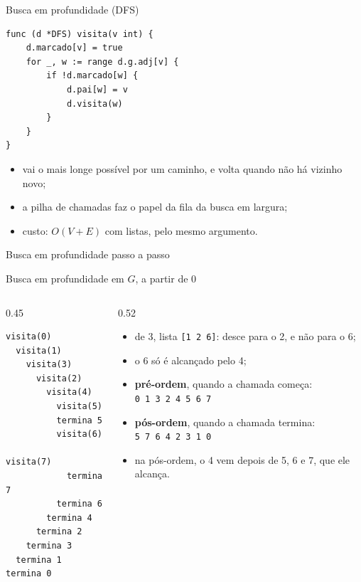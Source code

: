 \documentclass{beamer}
\begin{document}
\begin{frame}[fragile]{Busca em profundidade (DFS)}
	\begin{verbatim}
func (d *DFS) visita(v int) {
	d.marcado[v] = true
	for _, w := range d.g.adj[v] {
		if !d.marcado[w] {
			d.pai[w] = v
			d.visita(w)
		}
	}
}
\end{verbatim}

	\begin{itemize}
		\item vai o mais longe possível por um caminho, e volta quando não há
		      vizinho novo;
		\item a pilha de chamadas faz o papel da fila da busca em largura;
		\item custo: $O(V + E)$ com listas, pelo mesmo argumento.
	\end{itemize}
\end{frame}

\begin{frame}{Busca em profundidade passo a passo}
	\begin{center}
	\end{center}
\end{frame}

\begin{frame}[fragile]{Busca em profundidade em $G$, a partir de 0}
	\begin{columns}[T]
		\begin{column}{0.45\textwidth}
			\begin{verbatim}
visita(0)
  visita(1)
    visita(3)
      visita(2)
        visita(4)
          visita(5)
          termina 5
          visita(6)
            visita(7)
            termina 7
          termina 6
        termina 4
      termina 2
    termina 3
  termina 1
termina 0
\end{verbatim}
		\end{column}
		\begin{column}{0.52\textwidth}
			\begin{itemize}
				\small
				\item de 3, lista \texttt{[1 2 6]}: desce para o 2, e não para o 6;
				\item o 6 só é alcançado pelo 4;
				\item \textbf{pré-ordem}, quando a chamada começa:\\
				      \texttt{0 1 3 2 4 5 6 7}
				\item \textbf{pós-ordem}, quando a chamada termina:\\
				      \texttt{5 7 6 4 2 3 1 0}
				\item na pós-ordem, o 4 vem depois de 5, 6 e 7, que ele alcança.
			\end{itemize}
		\end{column}
	\end{columns}
\end{frame}
\end{document}
